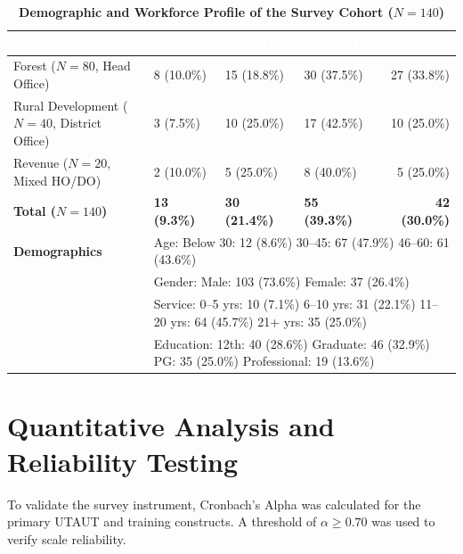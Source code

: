 \documentclass[10pt,a4paper]{article}
\begin{document}
\renewcommand{\arraystretch}{1.1}
\begin{table}[h!]
\centering
\footnotesize
\caption{\textbf{Demographic and Workforce Profile of the Survey Cohort ($N=140$)}}
\vspace{0.1cm}
\begin{tabularx}{\textwidth}{l X X X r}
\toprule
\rowcolor{navyblue}
\textcolor{white}{\textbf{Department}} & \textcolor{white}{\textbf{Class I}} & \textcolor{white}{\textbf{Class II}} & \textcolor{white}{\textbf{Class III}} & \textcolor{white}{\textbf{Class IV}} \\
\midrule
Forest ($N=80$, Head Office) & 8 (10.0\%) & 15 (18.8\%) & 30 (37.5\%) & 27 (33.8\%) \\
Rural Development ($N=40$, District Office) & 3 (7.5\%) & 10 (25.0\%) & 17 (42.5\%) & 10 (25.0\%) \\
Revenue ($N=20$, Mixed HO/DO) & 2 (10.0\%) & 5 (25.0\%) & 8 (40.0\%) & 5 (25.0\%) \\
\rowcolor{lightgray}
\textbf{Total ($N=140$)} & \textbf{13 (9.3\%)} & \textbf{30 (21.4\%)} & \textbf{55 (39.3\%)} & \textbf{42 (30.0\%)} \\
\midrule
\rowcolor{white}
\textbf{Demographics} & \multicolumn{4}{l}{Age: Below 30: 12 (8.6\%) \textbullet{} 30--45: 67 (47.9\%) \textbullet{} 46--60: 61 (43.6\%)} \\
 & \multicolumn{4}{l}{Gender: Male: 103 (73.6\%) \textbullet{} Female: 37 (26.4\%)} \\
\rowcolor{white}
 & \multicolumn{4}{l}{Service: 0--5 yrs: 10 (7.1\%) \textbullet{} 6--10 yrs: 31 (22.1\%) \textbullet{} 11--20 yrs: 64 (45.7\%) \textbullet{} 21+ yrs: 35 (25.0\%)} \\
 & \multicolumn{4}{l}{Education: 12th: 40 (28.6\%) \textbullet{} Graduate: 46 (32.9\%) \textbullet{} PG: 35 (25.0\%) \textbullet{} Professional: 19 (13.6\%)} \\
\bottomrule
\end{tabularx}
\end{table}

\section{Quantitative Analysis and Reliability Testing}
To validate the survey instrument, Cronbach's Alpha was calculated for the primary UTAUT and training constructs. A threshold of $\alpha \ge 0.70$ was used to verify scale reliability.
\end{document}
